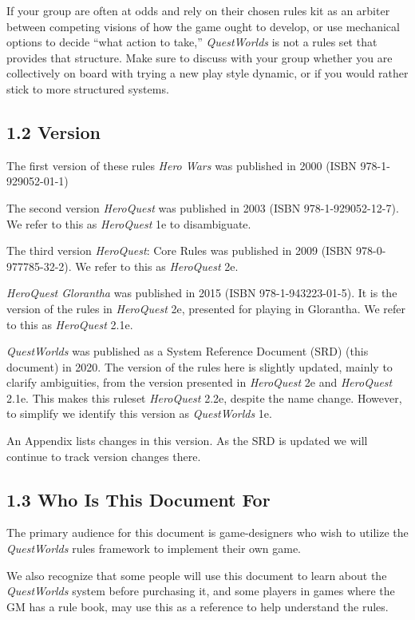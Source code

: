\documentclass[
  11pt,
]{article}
\begin{document}
If your group are often at odds and rely on their chosen rules kit as an
arbiter between competing visions of how the game ought to develop, or
use mechanical options to decide ``what action to take,''
\emph{QuestWorlds} is not a rules set that provides that structure. Make
sure to discuss with your group whether you are collectively on board
with trying a new play style dynamic, or if you would rather stick to
more structured systems.

\hypertarget{version}{%
\subsection{1.2 Version}\label{version}}

The first version of these rules \emph{Hero Wars} was published in 2000
(ISBN 978-1-929052-01-1)

The second version \emph{HeroQuest} was published in 2003 (ISBN
978-1-929052-12-7). We refer to this as \emph{HeroQuest} 1e to
disambiguate.

The third version \emph{HeroQuest}: Core Rules was published in 2009
(ISBN 978-0-977785-32-2). We refer to this as \emph{HeroQuest} 2e.

\emph{HeroQuest Glorantha} was published in 2015 (ISBN
978-1-943223-01-5). It is the version of the rules in \emph{HeroQuest}
2e, presented for playing in Glorantha. We refer to this as
\emph{HeroQuest} 2.1e.

\emph{QuestWorlds} was published as a System Reference Document (SRD)
(this document) in 2020. The version of the rules here is slightly
updated, mainly to clarify ambiguities, from the version presented in
\emph{HeroQuest} 2e and \emph{HeroQuest} 2.1e. This makes this ruleset
\emph{HeroQuest} 2.2e, despite the name change. However, to simplify we
identify this version as \emph{QuestWorlds} 1e.

An Appendix lists changes in this version. As the SRD is updated we will
continue to track version changes there.

\hypertarget{who-is-this-document-for}{%
\subsection{1.3 Who Is This Document
For}\label{who-is-this-document-for}}

The primary audience for this document is game-designers who wish to
utilize the \emph{QuestWorlds} rules framework to implement their own
game.

We also recognize that some people will use this document to learn about
the \emph{QuestWorlds} system before purchasing it, and some players in
games where the GM has a rule book, may use this as a reference to help
understand the rules.
\end{document}
